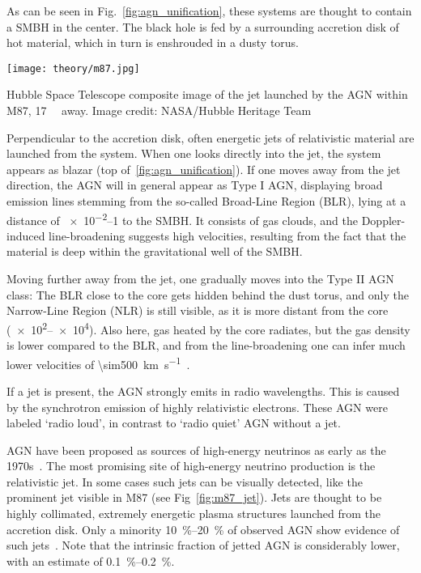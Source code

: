 As can be seen in Fig.~\ref{fig:agn_unification}, these systems are thought to contain a SMBH in the center. The black hole is fed by a surrounding accretion disk of hot material, which in turn is enshrouded in a dusty torus.

\begin{marginfigure}
    \texttt{[image: theory/m87.jpg]}
    \caption[M87 jet]{Hubble Space Telescope composite image of the jet launched by the AGN within M87, \SI{17}{\mega\parsec} away. Image credit: NASA/Hubble Heritage Team}
\end{marginfigure}

Perpendicular to the accretion disk, often energetic jets of relativistic material are launched from the system. When one looks directly into the jet, the system appears as blazar (top of~\ref{fig:agn_unification}). If one moves away from the jet direction, the AGN will in general appear as Type I AGN, displaying broad emission lines stemming from the so-called Broad-Line Region (BLR), lying at a distance of \SIrange{e-2}{1}{\parsec} to the SMBH. It consists of gas clouds, and the Doppler-induced line-broadening suggests high velocities, resulting from the fact that the material is deep within the gravitational well of the SMBH.

Moving further away from the jet, one gradually moves into the Type II AGN class: The BLR close to the core gets hidden behind the dust torus, and only the  Narrow-Line Region (NLR) is still visible, as it is more distant from the core (\SIrange{e2}{e4}{\parsec}). Also here, gas heated by the core radiates, but the gas density is lower compared to the BLR, and from the line-broadening one can infer much lower velocities of \SI{\sim500}{\kilo\m\per\s}~.

If a jet is present, the AGN strongly emits in radio wavelengths. This is caused by the synchrotron emission of highly relativistic electrons. These AGN were labeled `radio loud', in contrast to `radio quiet' AGN without a jet.

AGN have been proposed as sources of high-energy neutrinos as early as the 1970s~. The most promising site of high-energy neutrino production is the relativistic jet. In some cases such jets can be visually detected, like the prominent jet visible in M87 (see Fig~\ref{fig:m87_jet}). Jets are thought to be highly collimated, extremely energetic plasma structures launched from the accretion disk. Only a minority \SIrange{10}{20}{\percent} of observed AGN show evidence of such jets~. Note that the intrinsic fraction of jetted AGN is considerably lower, with an estimate of \SIrange{0.1}{0.2}{\percent}.

